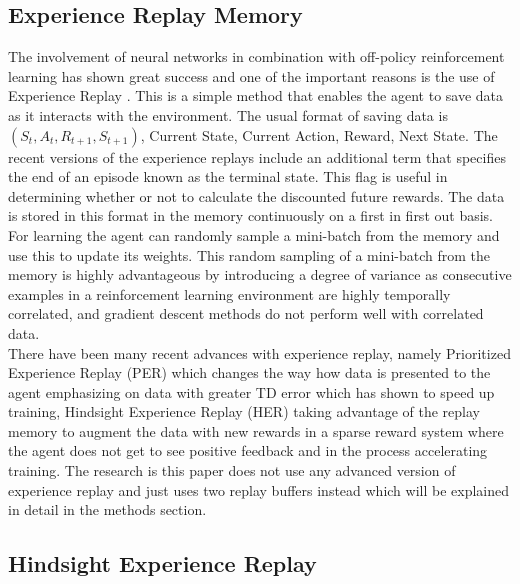 \subsection{Experience Replay Memory}

The involvement of neural networks in combination with off-policy reinforcement learning has shown great success and one of the important reasons is the use of Experience Replay \cite{zhang2018deeper} \cite{fedus2020revisiting}. This is a simple method that enables the agent to save data as it interacts with the environment. The usual format of saving data is $(S_t, A_t, R_{t+1}, S_{t+1})$, Current State, Current Action, Reward, Next State. The recent versions of the experience replays include an additional term that specifies the end of an episode known as the terminal state. This flag is useful in determining whether or not to calculate the discounted future rewards. The data is stored in this format in the memory continuously on a first in first out basis. For learning the agent can randomly sample a mini-batch from the memory and use this to update its weights. This random sampling of a mini-batch from the memory is highly advantageous by introducing a degree of variance as consecutive examples in a reinforcement learning environment are highly temporally correlated, and gradient descent methods do not perform well with correlated data. \\

There have been many recent advances with experience replay, namely Prioritized Experience Replay (PER) \cite{schaul2016prioritized} which changes the way how data is presented to the agent emphasizing on data with greater TD error which has shown to speed up training, Hindsight Experience Replay (HER) \cite{andrychowicz2018hindsight} taking advantage of the replay memory to augment the data with new rewards in a sparse reward system where the agent does not get to see positive feedback and in the process accelerating training. The research is this paper does not use any advanced version of experience replay and just uses two replay buffers instead which will be explained in detail in the methods section. \\

\subsection{Hindsight Experience Replay}

